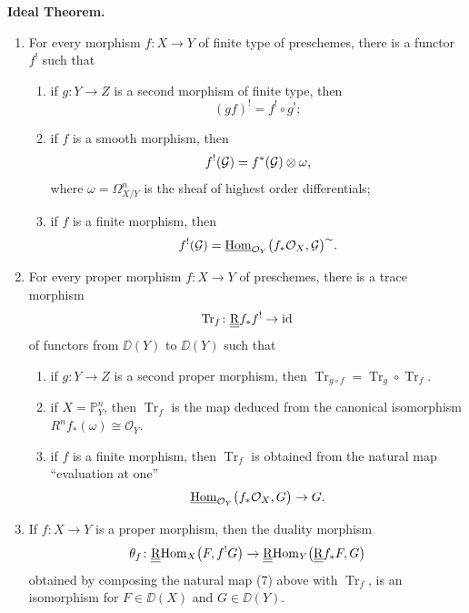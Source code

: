 \bigskip
\noindent
\textbf{Ideal Theorem.}
\begin{enumerate}
	\item[(a)] For every morphism $f\colon X\to Y$ of finite type of preschemes, there is a functor $f^{!}$ such that
	\begin{enumerate}
		\item[1)] if $g\colon Y\to Z$ is a second morphism of finite type, then
		\[
		(gf)^{!}=f^{!}\circ g^{!};
		\]
		\item[2)] if $f$ is a smooth morphism, then
		\[
		f^{!}(\mathcal{G})=f^{*}(\mathcal{G})\otimes\omega,
		\]
		where $\omega=\Omega_{X/Y}^{n}$ is the sheaf of highest order differentials;
		\item[3)] if $f$ is a finite morphism, then
		\[
		f^{!}(\mathcal{G})=\underline{\operatorname{Hom}}_{\mathcal{O}_{Y}}\bigl(f_{*}\mathcal{O}_{X},\mathcal{G}\bigr)^{\sim}.
		\]
	\end{enumerate}

\item[(b)] For every proper morphism $f\colon X\to Y$ of preschemes, there is a trace morphism
\[
\operatorname{Tr}_{f}\colon \underline{\underline{\operatorname{R}}} f_{*}f^{!}\to\operatorname{id}
\]
of functors from $\DD(Y)$ to $\DD(Y)$ such that
\begin{enumerate}
	\item[1)] if $g\colon Y\to Z$ is a second proper morphism, then $\operatorname{Tr}_{g\circ f}=\operatorname{Tr}_{g}\circ\operatorname{Tr}_{f}$.
	\item[2)] if $X=\mathbb{P}_{Y}^{n}$, then $\operatorname{Tr}_{f}$ is the map deduced from the canonical isomorphism $R^{n}f_{*}(\omega)\cong\mathcal{O}_{Y}$.
	\item[3)] if $f$ is a finite morphism, then $\operatorname{Tr}_{f}$ is obtained from the natural map ``evaluation at one''
	\[
	\underline{\operatorname{Hom}}_{\mathcal{O}_Y}\bigl(f_{*}\mathcal{O}_{X},G\bigr)\to G.
	\]
\end{enumerate}

\smallskip
\item[(c)] If $f\colon X\to Y$ is a proper morphism, then the duality morphism
\[
\theta_{f}\colon \underline{\underline{\operatorname{R}}}{\operatorname{Hom}}_{X}\bigl(F,f^{!}G\bigr)\to \underline{\underline{\operatorname{R}}}{\operatorname{Hom}}_{Y}\bigl(\underline{\underline{\operatorname{R}}} f_{*}F,G\bigr)
\]
obtained by composing the natural map (7) above with $\operatorname{Tr}_{f}$, is an isomorphism for $F\in \DD(X)$ and $G\in \DD(Y)$.

\bigskip
	
\end{enumerate}


